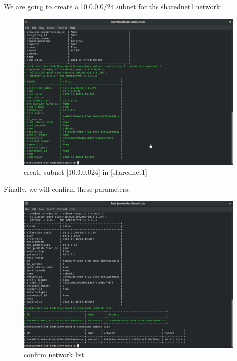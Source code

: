 \begin{spacing}{1.2}
\par We are going to create a 10.0.0.0/24 subnet for the sharednet1 network: 
\\
\begin{figure}[!htb] 
\begin{center} 
\includegraphics[width=1\linewidth]{Cloud/Configuring Neutron Networking/create subnet [10.0.0.024] in [sharednet1]} 
\end{center} 
\caption{create subnet [10.0.0.024] in [sharednet1]} 
\end{figure} 
\FloatBarrier

\par Finally, we will confirm these parameters:
\\
\begin{figure}[!htb] 
\begin{center} 
\includegraphics[width=1\linewidth]{Cloud/Configuring Neutron Networking/confirm network list} 
\end{center} 
\caption{confirm network list} 
\end{figure} 
\FloatBarrier


\end{spacing}